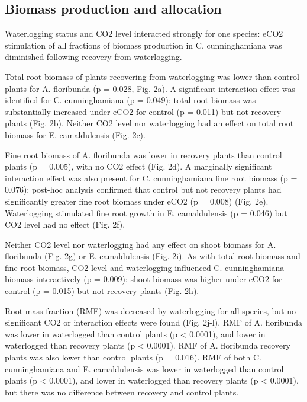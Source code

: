 \documentclass[12pt,a4paper]{memoir}
\begin{document}
\subsection*{Biomass production and allocation}
Waterlogging status and CO2 level interacted strongly for one species: eCO2 stimulation of all fractions of biomass production in C. cunninghamiana was diminished following recovery from waterlogging. 

Total root biomass of plants recovering from waterlogging was lower than control plants for A. floribunda (p = 0.028, Fig. 2a). A significant interaction effect was identified for C. cunninghamiana (p = 0.049): total root biomass was substantially increased under eCO2 for control (p = 0.011) but not recovery plants (Fig. 2b). Neither CO2 level nor waterlogging had an effect on total root biomass for E. camaldulensis (Fig. 2c). 

Fine root biomass of A. floribunda was lower in recovery plants than control plants (p = 0.005), with no CO2 effect (Fig. 2d). A marginally significant interaction effect was also present for C. cunninghamiana fine root biomass (p = 0.076); post-hoc analysis confirmed that control but not recovery plants had significantly greater fine root biomass under eCO2 (p = 0.008) (Fig. 2e). Waterlogging stimulated fine root growth in E. camaldulensis (p = 0.046) but CO2 level had no effect (Fig. 2f).

Neither CO2 level nor waterlogging had any effect on shoot biomass for A. floribunda (Fig. 2g) or E. camaldulensis (Fig. 2i). As with total root biomass and fine root biomass, CO2 level and waterlogging influenced C. cunninghamiana biomass interactively (p = 0.009): shoot biomass was higher under eCO2 for control (p = 0.015) but not recovery plants (Fig. 2h).

Root mass fraction (RMF) was decreased by waterlogging for all species, but no significant CO2 or interaction effects were found (Fig. 2j-l). RMF of A. floribunda was lower in waterlogged than control plants (p < 0.0001), and lower in waterlogged than recovery plants (p < 0.0001). RMF of A. floribunda recovery plants was also lower than control plants (p = 0.016). RMF of both C. cunninghamiana and E. camaldulensis was lower in waterlogged than control plants (p < 0.0001), and lower in waterlogged than recovery plants (p < 0.0001), but there was no difference between recovery and control plants.
\end{document}
